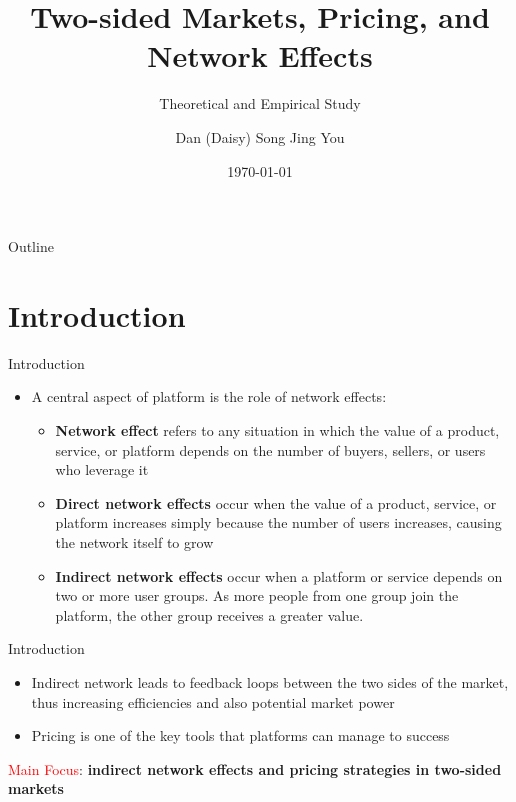 \documentclass[aspectratio=169]{beamer}  %
\title{Two-sided Markets, Pricing, and Network Effects}
\subtitle{Theoretical and Empirical Study}
\author{Dan (Daisy) Song \quad Jing You}
\institute{Hong Kong University of Science and Technology}
\date{\today}
\begin{document}
\begin{frame}
    \titlepage
\end{frame}

\begin{frame}{Outline}
    \tableofcontents
\end{frame}

\section{Introduction}
\begin{frame}{Introduction}
    \begin{itemize}
        \item A central aspect of platform is the role of network effects:
        \vspace{1em}
        \begin{itemize}
            \item \textbf{Network effect} refers to any situation in which the value of a product, service, or platform depends on the number of buyers, sellers, or users who leverage it
            \vspace{1em}
            \item \textbf{Direct network effects} occur when the value of a product, service, or platform increases simply because the number of users increases, causing the network itself to grow
            \vspace{1em}
            \item \textbf{Indirect network effects} occur when a platform or service depends on two or more user groups. As more people from one group join the platform, the other group receives a greater value.
        \end{itemize}

    \end{itemize}
\end{frame}

\begin{frame}{Introduction}
    \begin{itemize}        
        \item Indirect network leads to feedback loops between the two sides of the market, thus increasing efficiencies and also potential market power
        \vspace{1em}
        \item Pricing is one of the key tools that platforms can manage to success
    \end{itemize}
    \vspace{2em}

    \textcolor{red}{Main Focus}: \textbf{indirect network effects and pricing strategies in two-sided markets}
\end{frame}
\end{document}
